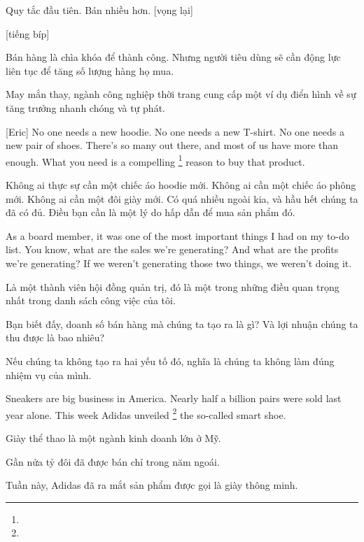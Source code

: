 \documentclass[a4paper]{article}
\begin{document}
	\begin{vietnamese-v2}
		
		Quy tắc đầu tiên. Bán nhiều hơn. [vọng lại]
		
		[tiếng bíp]
		
		Bán hàng là chìa khóa để thành công. Nhưng người tiêu dùng sẽ cần động lực liên tục để tăng số lượng hàng họ mua.
		
		May mắn thay, ngành công nghiệp thời trang cung cấp một ví dụ điển hình về sự tăng trưởng nhanh chóng và tự phát.
	\end{vietnamese-v2}
	
	
	[Eric] No one needs a new hoodie. No one needs a new T-shirt. No one needs a new pair of shoes. There's so many out there, and most of us have more than enough. What you need is a compelling \footnote[7]{} reason to buy that product.
	
	\begin{vietnamese-v2}
		[Eric] Không ai thực sự cần một chiếc áo hoodie mới. Không ai cần một chiếc áo phông mới. Không ai cần một đôi giày mới. Có quá nhiều ngoài kia, và hầu hết chúng ta đã có đủ. Điều bạn cần là một lý do hấp dẫn để mua sản phẩm đó.
	\end{vietnamese-v2}
	
	As a board member, it was one of the most important things I had on my to-do list.
	You know, what are the sales we're generating?
	And what are the profits we're generating?
	If we weren't generating those two things, we weren't doing it.
	
	\begin{vietnamese-v2}
		Là một thành viên hội đồng quản trị, đó là một trong những điều quan trọng nhất trong danh sách công việc của tôi.
		
		Bạn biết đấy, doanh số bán hàng mà chúng ta tạo ra là gì? Và lợi nhuận chúng ta thu được là bao nhiêu?
		
		Nếu chúng ta không tạo ra hai yếu tố đó, nghĩa là chúng ta không làm đúng nhiệm vụ của mình.
	\end{vietnamese-v2}
	
	
	Sneakers are big business in America. 
	Nearly half a billion pairs were sold last year alone. 
	This week Adidas unveiled \footnote{} the so-called smart shoe.
	
	\begin{vietnamese-v2}
		Giày thể thao là một ngành kinh doanh lớn ở Mỹ.  
		
		Gần nửa tỷ đôi đã được bán chỉ trong năm ngoái.  
		
		Tuần này, Adidas đã ra mắt sản phẩm được gọi là giày thông minh.
	\end{vietnamese-v2}
	
\end{document}
